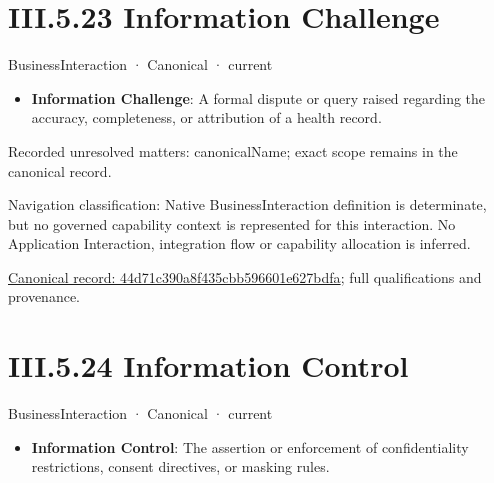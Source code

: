\section*{III.5.23 Information Challenge}
\label{navigation:III.5.23}

\label{element:44d71c390a8f435cbb596601e627bdfa}
{\small BusinessInteraction · Canonical · current}\par

\begin{itemize}


\item \textbf{Information Challenge}: A formal dispute or query raised regarding the accuracy, completeness, or attribution of a health record.

\end{itemize}

{\small Recorded unresolved matters: canonicalName; exact scope remains in the canonical record.}\par
{\small Navigation classification: Native BusinessInteraction definition is determinate, but no governed capability context is represented for this interaction. No Application Interaction, integration flow or capability allocation is inferred.}\par
{\footnotesize \href{../../../../continuum/business/business-interaction/44d71c390a8f435cbb596601e627bdfa.md}{Canonical record: 44d71c390a8f435cbb596601e627bdfa}; full qualifications and provenance.}\par
\section*{III.5.24 Information Control}
\label{navigation:III.5.24}

\label{element:773133f23f7540eb9b90d39ca872aebd}
{\small BusinessInteraction · Canonical · current}\par

\begin{itemize}


\item \textbf{Information Control}: The assertion or enforcement of confidentiality restrictions, consent directives, or masking rules.

\end{itemize}

